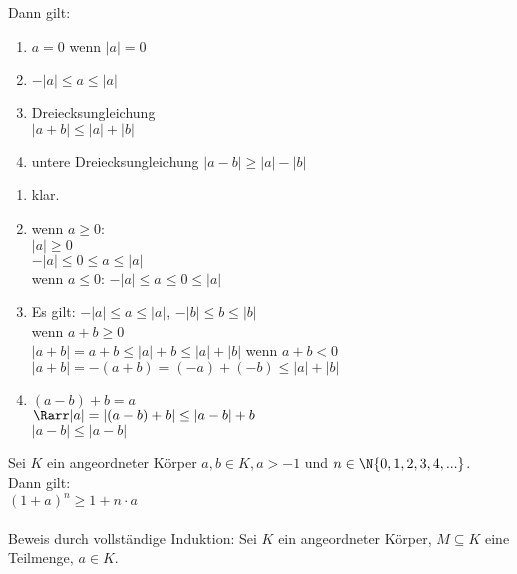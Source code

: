 	Dann gilt:
	\begin{enumerate}
	\item{$a = 0$ wenn $|a| = 0$}
	\item{$-|a| \leq a \leq |a|$}
	\item{Dreiecksungleichung\\
	$|a + b| \leq |a| + |b|$}
	\item{untere Dreiecksungleichung
	$|a - b| \geq |a| - |b|$} %
	\end{enumerate}
\bew
	\begin{enumerate}
	\item{klar.}
	\item{wenn $a \geq 0$:\\
	$|a| \geq 0$\\
	\Rarr $ -|a| \leq 0 \leq a \leq |a|$\\
	wenn $a \leq 0$:
	$-|a| \leq a \leq 0 \leq |a|$}
	\item{Es gilt: $-|a| \leq a \leq |a|$, $-|b| \leq b \leq |b|$\\
	wenn $a + b \geq 0$\\
	$|a + b| = a + b \leq |a| + b \leq |a| + |b|$
	wenn $a + b < 0$\\
	$|a + b| = -(a + b) = (-a) + (-b) \leq |a| + |b|$}
	\item{$(a - b) + b = a$\\
	$\Rarr |a| = |(a - b) + b| \leq |a - b| + b$\\
	$|a - b| \leq |a - b|$} %
	\end{enumerate}
	Sei $K$ ein angeordneter Körper $a, b \in K, a > -1$ und $n \in \N \{0, 1, 2, 3, 4, ...\}$.\\
	Dann gilt:\\
	$(1 + a)^n \geq 1 + n \cdot a$\\
	\\
	Beweis durch vollständige Induktion:
	Sei $K$ ein angeordneter Körper, $M \subseteq K$ eine Teilmenge, $a \in K$.\\
